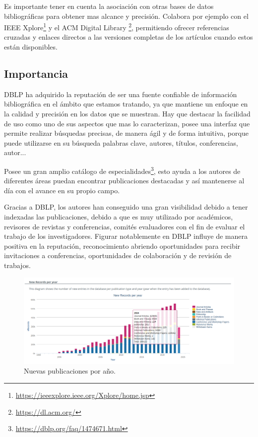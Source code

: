 \documentclass[a4paper, 12pt]{book}
\begin{document}
Es importante tener en cuenta la asociación con otras bases de datos bibliográficas para obtener mas alcance y precisión. Colabora por ejemplo con el IEEE Xplore\footnote{\url{https://ieeexplore.ieee.org/Xplore/home.jsp}} y el ACM Digital Library \footnote{\url{https://dl.acm.org/}}, permitiendo ofrecer referencias cruzadas y enlaces directos a las versiones completas de los artículos cuando estos están disponibles.

\subsection{Importancia}
DBLP ha adquirido la reputación de ser una fuente confiable de información bibliográfica en el ámbito que estamos tratando, ya que mantiene un enfoque en la calidad y precisión en los datos que se muestran. 
Hay que destacar la facilidad de uso como uno de sus aspectos que mas lo caracterizan, posee una interfaz que permite realizar búsquedas precisas, de manera ágil y de forma intuitiva, porque puede utilizarse en su búsqueda palabras clave, autores, títulos, conferencias, autor... 

Posee un gran amplio catálogo de especialidades\footnote{\url{https://dblp.org/faq/1474671.html}}, esto ayuda a los autores de diferentes áreas puedan encontrar publicaciones destacadas y así mantenerse al día con el avance en su propio campo.

Gracias a DBLP, los autores han conseguido una gran visibilidad debido a tener indexadas las publicaciones, debido a que es muy utilizado por académicos, revisores de revistas y conferencias, comités evaluadores con el fin de evaluar el trabajo de los investigadores. Figurar notablemente en DBLP influye de manera positiva en la reputación, reconocimiento abriendo oportunidades para recibir invitaciones a conferencias, oportunidades de colaboración y de revisión de trabajos.

\begin{figure}[h]
    \centering
    \includegraphics[width=16cm, keepaspectratio]{img/dblp_new_records_per_year.png}
    \caption{Nuevas publicaciones por año.}
    \label{figura:progresion_base_dblp}
 \end{figure}
\end{document}
